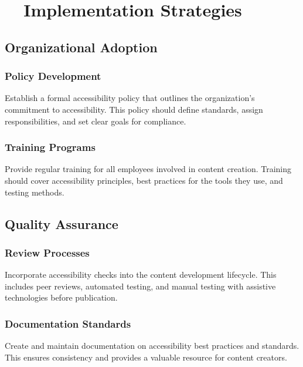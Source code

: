 \section{~~Implementation Strategies}\label{ch15:sec:implementation-strategies}

\subsection{Organizational Adoption}\label{ch15:ssec:org-adoption}

\subsubsection{Policy Development}\label{ch15:sssec:policy-dev}
Establish a formal accessibility policy that outlines the organization's commitment to accessibility. This policy should define standards, assign responsibilities, and set clear goals for compliance.

\subsubsection{Training Programs}\label{ch15:sssec:training-programs}
Provide regular training for all employees involved in content creation. Training should cover accessibility principles, best practices for the tools they use, and testing methods.

\subsection{Quality Assurance}\label{ch15:ssec:qa}

\subsubsection{Review Processes}\label{ch15:sssec:review-processes}
Incorporate accessibility checks into the content development lifecycle. This includes peer reviews, automated testing, and manual testing with assistive technologies before publication.

\subsubsection{Documentation Standards}\label{ch15:sssec:doc-standards}
Create and maintain documentation on accessibility best practices and standards. This ensures consistency and provides a valuable resource for content creators.

